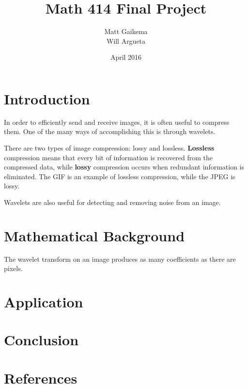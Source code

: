 \documentclass{article}
\title{Math 414 Final Project}
\author{Matt Gaikema \\ Will Argueta}
\date{April 2016}
\begin{document}
\maketitle

\section{Introduction}

In order to efficiently send and receive images, it is often useful to compress them.
One of the many ways of accomplishing this is through wavelets.

There are two types of image compression: lossy and lossless.
\textbf{Lossless} compression means that every bit of information is recovered from the compressed data,
while \textbf{lossy} compression occurs when redundant information is eliminated.
The GIF is an example of lossless compression, while the JPEG is lossy.

Wavelets are also useful for detecting and removing noise from an image.


\section{Mathematical Background}

The wavelet transform on an image produces as many coefficients as there are pixels.


\section{Application}


\section{Conclusion}


\section{References}
\end{document}
